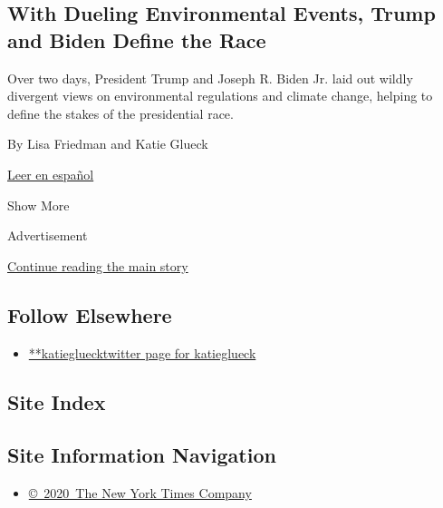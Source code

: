 \begin{enumerate}
  \hypertarget{with-dueling-environmental-events-trump-and-biden-define-the-race}{%
  \subsection{With Dueling Environmental Events, Trump and Biden Define
  the
  Race}\label{with-dueling-environmental-events-trump-and-biden-define-the-race}}

  Over two days, President Trump and Joseph R. Biden Jr. laid out wildly
  divergent views on environmental regulations and climate change,
  helping to define the stakes of the presidential race.

  By Lisa Friedman and Katie Glueck

  \href{https://www.nytimes3xbfgragh.onion/es/2020/07/17/espanol/estados-unidos/cambio-climatico-trump-biden.html}{Leer
  en español}
\end{enumerate}

Show More

Advertisement

\protect\hyperlink{after-mid2}{Continue reading the main story}

\hypertarget{follow-elsewhere}{%
\subsection{Follow Elsewhere}\label{follow-elsewhere}}

\begin{itemize}
\tightlist
\item
  \href{https://twitter.com/katieglueck}{**katiegluecktwitter page for
  katieglueck}
\end{itemize}

\hypertarget{site-index}{%
\subsection{Site Index}\label{site-index}}

\hypertarget{site-information-navigation}{%
\subsection{Site Information
Navigation}\label{site-information-navigation}}

\begin{itemize}
\tightlist
\item
  \href{https://help.nytimes3xbfgragh.onion/hc/en-us/articles/115014792127-Copyright-notice}{©~2020~The
  New York Times Company}
\end{itemize}

